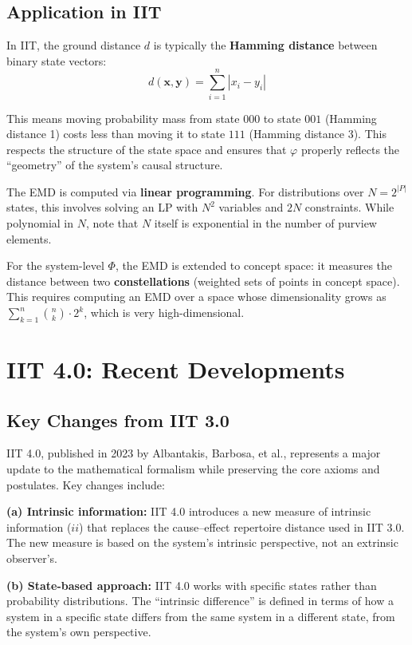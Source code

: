 \documentclass[11pt,a4paper]{report}
\newcommand{\Phi}{\varPhi}
\begin{document}
\section{Application in IIT}

In IIT, the ground distance $d$ is typically the \textbf{Hamming distance} between binary state vectors:
\[
  d(\mathbf{x}, \mathbf{y}) = \sum_{i=1}^{n} |x_i - y_i|
\]

This means moving probability mass from state $000$ to state $001$ (Hamming distance 1) costs less than moving it to state $111$ (Hamming distance 3). This respects the structure of the state space and ensures that $\varphi$ properly reflects the ``geometry'' of the system's causal structure.

The EMD is computed via \textbf{linear programming}. For distributions over $N = 2^{|P|}$ states, this involves solving an LP with $N^2$ variables and $2N$ constraints. While polynomial in $N$, note that $N$ itself is exponential in the number of purview elements.

For the system-level $\Phi$, the EMD is extended to concept space: it measures the distance between two \textbf{constellations} (weighted sets of points in concept space). This requires computing an EMD over a space whose dimensionality grows as $\sum_{k=1}^{n} \binom{n}{k} \cdot 2^k$, which is very high-dimensional.


\chapter{IIT 4.0: Recent Developments}

\section{Key Changes from IIT 3.0}

IIT 4.0, published in 2023 by Albantakis, Barbosa, et al., represents a major update to the mathematical formalism while preserving the core axioms and postulates. Key changes include:

\textbf{(a) Intrinsic information:} IIT 4.0 introduces a new measure of intrinsic information ($ii$) that replaces the cause--effect repertoire distance used in IIT 3.0. The new measure is based on the system's intrinsic perspective, not an extrinsic observer's.

\textbf{(b) State-based approach:} IIT 4.0 works with specific states rather than probability distributions. The ``intrinsic difference'' is defined in terms of how a system in a specific state differs from the same system in a different state, from the system's own perspective.
\end{document}
